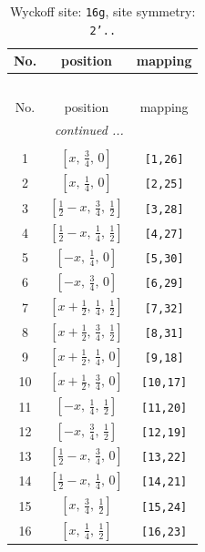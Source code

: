 \documentclass[fleqn,8pt]{jsarticle}
\begin{document}
\begin{longtable}{ccc}
\caption{Wyckoff site: {\tt 16g}, site symmetry: {\tt 2'..}}
 \\
 \hline \hline
No. & position & mapping \\ \hline \endfirsthead

\multicolumn{2}{l}{\tablename\ \thetable{}} \\
 \hline \hline
No. & position & mapping \\ \hline \endhead

 \hline \hline
\multicolumn{2}{r}{\footnotesize\it continued ...} \\ \endfoot

 \hline \hline
\multicolumn{2}{r}{} \\ \endlastfoot

1 & $\left[ x,\, \frac{3}{4},\, 0 \right]$ & {\tt [1,26]} \\ \hline
2 & $\left[ x,\, \frac{1}{4},\, 0 \right]$ & {\tt [2,25]} \\ \hline
3 & $\left[ \frac{1}{2} - x,\, \frac{3}{4},\, \frac{1}{2} \right]$ & {\tt [3,28]} \\ \hline
4 & $\left[ \frac{1}{2} - x,\, \frac{1}{4},\, \frac{1}{2} \right]$ & {\tt [4,27]} \\ \hline
5 & $\left[ - x,\, \frac{1}{4},\, 0 \right]$ & {\tt [5,30]} \\ \hline
6 & $\left[ - x,\, \frac{3}{4},\, 0 \right]$ & {\tt [6,29]} \\ \hline
7 & $\left[ x + \frac{1}{2},\, \frac{1}{4},\, \frac{1}{2} \right]$ & {\tt [7,32]} \\ \hline
8 & $\left[ x + \frac{1}{2},\, \frac{3}{4},\, \frac{1}{2} \right]$ & {\tt [8,31]} \\ \hline
9 & $\left[ x + \frac{1}{2},\, \frac{1}{4},\, 0 \right]$ & {\tt [9,18]} \\ \hline
10 & $\left[ x + \frac{1}{2},\, \frac{3}{4},\, 0 \right]$ & {\tt [10,17]} \\ \hline
11 & $\left[ - x,\, \frac{1}{4},\, \frac{1}{2} \right]$ & {\tt [11,20]} \\ \hline
12 & $\left[ - x,\, \frac{3}{4},\, \frac{1}{2} \right]$ & {\tt [12,19]} \\ \hline
13 & $\left[ \frac{1}{2} - x,\, \frac{3}{4},\, 0 \right]$ & {\tt [13,22]} \\ \hline
14 & $\left[ \frac{1}{2} - x,\, \frac{1}{4},\, 0 \right]$ & {\tt [14,21]} \\ \hline
15 & $\left[ x,\, \frac{3}{4},\, \frac{1}{2} \right]$ & {\tt [15,24]} \\ \hline
16 & $\left[ x,\, \frac{1}{4},\, \frac{1}{2} \right]$ & {\tt [16,23]} \\
\end{longtable}
\end{document}
